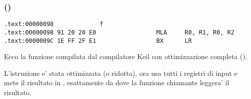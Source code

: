 \subsubsection{\OptimizingKeilVI (\ARMMode)}

\begin{lstlisting}[label=ARM_leaf_example1]
.text:00000098             f
.text:00000098 91 20 20 E0                 MLA     R0, R1, R0, R2
.text:0000009C 1E FF 2F E1                 BX      LR
\end{lstlisting}


Ecco la funzione \ttf compilata dal compilatore Keil con ottimizzazione completa (\Othree).

L'istruzione \MOV e' stata ottimizzata (o ridotta), ora  usa tutti i registri di input e mete il risultato in , esattamente da dove
la funzione chiamante leggera' il risultato.
